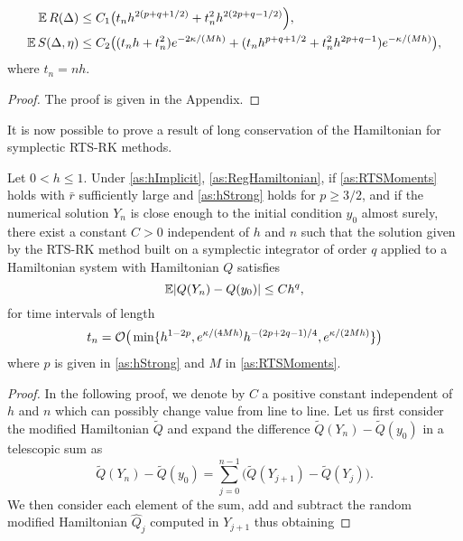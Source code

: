 \documentclass[10pt]{article}
\begin{document}
{\begin{lemma}
	\begin{equation}
	\begin{aligned}
		\operatorname{\mathbb{E}} R(\Delta) &\leq C_1 \big(t_n h^{2(p + q + 1/2)} + t_n^2 h^{2(2p + q - 1/2)}\Big),\\
		\operatorname{\mathbb{E}} S(\Delta, \eta) &\leq C_2 \big( (t_n h + t_n^2) e^{-2\kappa/(Mh)} + (t_n h^{p+q+1/2} + t_n^2 h^{2p+q-1})e^{-\kappa/(Mh)}\big),
	\end{aligned}
	\end{equation}
	where $t_n = nh$.
\end{lemma}
\begin{proof} The proof is given in the Appendix. \end{proof}
It is now possible to prove a result of long conservation of the Hamiltonian for symplectic RTS-RK methods.
\begin{theorem}\label{thm:RTSHamiltonian} Let $0 < h \leq 1$. Under \cref{as:hImplicit}, \cref{as:RegHamiltonian}, if \cref{as:RTSMoments} holds with $\bar r$ sufficiently large and \cref{as:hStrong} holds for $p \geq 3/2$, and if the numerical solution $Y_n$ is close enough to the initial condition $y_0$ almost surely, there exist a constant $C > 0$ independent of $h$ and $n$ such that the solution given by the RTS-RK method built on a symplectic integrator of order $q$ applied to a Hamiltonian system with Hamiltonian $Q$ satisfies
		\begin{equation}
		\operatorname{\mathbb{E}} \lvert Q(Y_n) - Q(y_0)\rvert \leq C h^q,
		\end{equation}
		for time intervals of length 
		\begin{equation}
		t_n = \mathcal{O}\big(\min\{h^{1-2p}, e^{\kappa/(4Mh)} h^{-(2p+2q-1)/4}, e^{\kappa/(2Mh)}\}\big)
		\end{equation}
		where $p$ is given in \cref{as:hStrong} and $M$ in \cref{as:RTSMoments}.
\end{theorem}
\begin{proof} In the following proof, we denote by $C$ a positive constant independent of $h$ and $n$ which can possibly change value from line to line. Let us first consider the modified Hamiltonian $\tilde Q$ and expand the difference $\tilde Q(Y_n) - \tilde Q(y_0)$ in a telescopic sum as
	\begin{equation}\label{eq:ProofHamiltionianBase}
	\tilde Q(Y_n) - \tilde Q(y_0) = \sum_{j=0}^{n-1} \big(\tilde Q(Y_{j+1}) - \tilde Q(Y_j)\big).
	\end{equation}
	We then consider each element of the sum, add and subtract the random modified Hamiltonian $\hat Q_j$ computed in $Y_{j+1}$ thus obtaining

\end{proof}}
\end{document}
